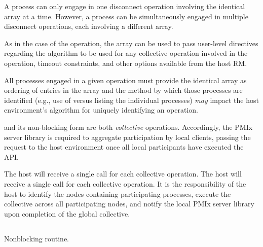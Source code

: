 A process can only engage in one disconnect operation involving the identical  array at a time.
However, a process can be simultaneously engaged in multiple disconnect operations, each involving a different  array.

As in the case of the  operation, the  array can be used to pass user-level directives regarding the algorithm to be used for any collective operation involved in the operation, timeout constraints, and other options available from the host \ac{RM}.

\adviceuserstart
All processes engaged in a given  operation must provide the identical  array as ordering of entries in the array and the method by which those processes are identified (e.g., use of  versus listing the individual processes) \textit{may} impact the host environment's algorithm for uniquely identifying an operation.
\adviceuserend

\adviceimplstart
{} and its non-blocking form are both \emph{collective} operations. Accordingly, the \ac{PMIx} server library is required to aggregate participation by local clients, passing the request to the host environment once all local participants have executed the \ac{API}.
\adviceimplend

\advicermstart
The host will receive a single call for each collective operation. The host will receive a single call for each collective operation. It is the responsibility of the host to identify the nodes containing participating processes, execute the collective across all participating nodes, and notify the local \ac{PMIx} server library upon completion of the global collective.

\advicermend


\subsection{}

\summary

Nonblocking  routine.

\format



